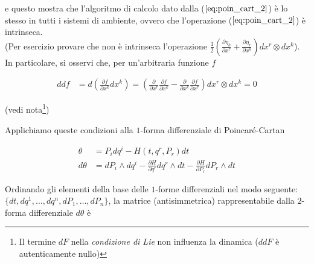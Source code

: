 e questo mostra che l'algoritmo di calcolo dato dalla ($ \ref{eq:poin_cart_2} $) è lo stesso in tutti i sistemi di ambiente, ovvero che l'operazione ($ \ref{eq:poin_cart_2} $) è intrinseca.\\
(Per esercizio provare che non è intrinseca l'operazione $ \frac{1}{2} \left( \frac{\partial \eta_{k}}{\partial x^r} + \frac{\partial \eta_{r}}{\partial x^k} \right) dx^r \otimes dx^k $).\\
In particolare, si osservi che, per un'arbitraria funzione $f$

\begin{equation*}
  \begin{split}
    ddf&=d \left( \frac{\partial f}{\partial x^k}dx^k\right) = \left( \frac{\partial}{\partial x^r} \frac{\partial f}{\partial x^k} - \frac{\partial}{\partial x^k} \frac{\partial f}{\partial x^r} \right) dx^r \otimes dx^k = 0
  \end{split}
\end{equation*}

\begin{flushright}
(vedi nota\footnote{Il termine $dF$ nella \textit{condizione di Lie} non influenza la dinamica ($ddF$ è autenticamente nullo)})
\end{flushright}

Applichiamo queste condizioni alla $ 1 $-forma differenziale di Poincaré-Cartan

\begin{equation*}
  \begin{split}
    \theta &= P_i dq^i - H (t, q^r, P_r) dt\\
    d\theta &= dP_i \wedge dq^i - \frac{\partial H}{\partial q^r} dq^r \wedge dt - \frac{\partial H}{\partial P_r} dP_r \wedge dt
  \end{split}
\end{equation*}


Ordinando gli elementi della base delle $ 1 $-forme differenziali nel modo seguente: $ \{ dt, dq^1, \dots , dq^n, dP_1, \dots , dP_n \} $, la matrice (antisimmetrica) rappresentabile dalla $ 2 $-forma differenziale $ d \theta $ è

